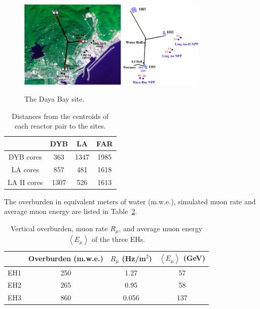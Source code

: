 \begin{figure}
	\centering
	\includegraphics[width=0.45\textwidth]{figures/chap3/dayabay_site.eps}
	\includegraphics[width=0.35\textwidth]{figures/chap3/dayabay_site_illustration.eps}
	\caption{The Daya Bay site.}
	\label{fig:dybsite}
\end{figure}

\begin{table}
	\centering
	\begin{tabular}{|c|c|c|c|}
	\hline
	& DYB & LA & FAR \\
	\hline
	DYB cores & 363 & 1347 & 1985 \\
	\hline
	LA cores & 857 & 481 & 1618 \\
	\hline
	LA II cores & 1307 & 526 & 1613 \\
	\hline
	\end{tabular}
	\caption{Distances from the centroids of each reactor pair to the sites.}
	\label{tab:sitecoredist}
\end{table}
The overburden in equivalent meters of water (m.w.e.), simulated muon rate and average muon energy are listed in Table~\ref{table:muon_rate}.
\begin{table}
	\centering
	\begin{tabular}{cccc}
		\toprule
		& Overburden (m.w.e.) & $R_\mu$ (Hz/m$^2$) & $\left\langle E_\mu \right\rangle$ (GeV) \\
		\midrule
		EH1 & 250 & 1.27 & 57 \\
		EH2 & 265 & 0.95 & 58 \\
		EH3 & 860 & 0.056 & 137 \\
		\bottomrule
	\end{tabular}
	\caption{Vertical overburden, muon rate $R_\mu$, and average muon energy $\left\langle E_\mu \right\rangle$ of the three EHs.}
	\label{table:muon_rate}
\end{table}


